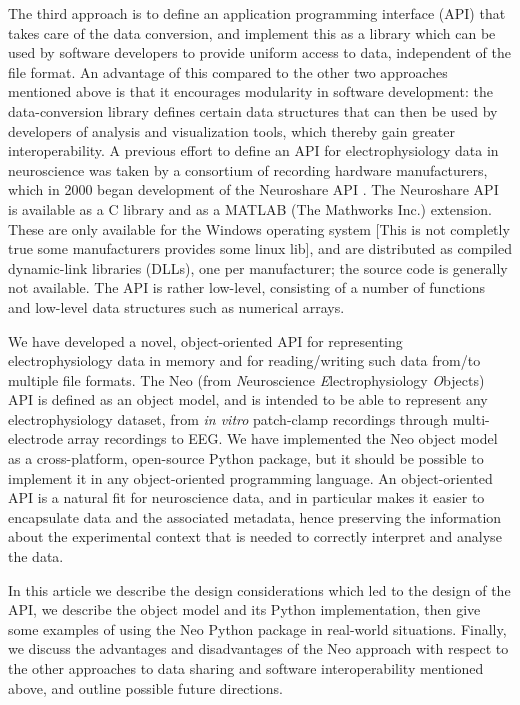 \documentclass{frontiers}
\newcommand{\latin}[1]{\textit{#1}}
\newcommand{\samuel}[1]{[\textcolor{RubineRed}{#1}]}
\begin{document}
The third approach is to define an application programming interface (API) that takes care of the data conversion, and implement this as a library which can be used by software developers to provide uniform access to data, independent of the file format.
An advantage of this compared to the other two approaches mentioned above is that it encourages modularity in software development: the data-conversion library defines certain data structures that can then be used by developers of analysis and visualization tools, which thereby gain greater interoperability.
A previous effort to define an API for electrophysiology data in neuroscience was taken by a consortium of recording hardware manufacturers, which in 2000 began development of the Neuroshare API \citep{neuroshare}.
The Neuroshare API is available as a C library and as a MATLAB (The Mathworks Inc.) extension.
These are only available for the Windows operating system \samuel{This is not completly true some manufacturers provides some linux lib}, and are distributed as compiled dynamic-link libraries (DLLs), one per manufacturer; the source code is generally not available.
The API is rather low-level, consisting of a number of functions and low-level data structures such as numerical arrays.

We have developed a novel, object-oriented API for representing electrophysiology data in memory and for reading/writing such data from/to multiple file formats.
The Neo (from \emph{N}euroscience \emph{E}lectrophysiology \emph{O}bjects) API is defined as an object model, and is intended to be able to represent any electrophysiology dataset, from \latin{in vitro} patch-clamp recordings through multi-electrode array recordings to EEG.
We have implemented the Neo object model as a cross-platform, open-source Python package, but it should be possible to implement it in any object-oriented programming language.
An object-oriented API is a natural fit for neuroscience data, and in particular makes it easier to encapsulate data and the associated metadata, hence preserving the information about the experimental context that is needed to correctly interpret and analyse the data.

In this article we describe the design considerations which led to the design of the API, we describe the object model and its Python implementation, then give some examples of using the Neo Python package in real-world situations. Finally, we discuss the advantages and disadvantages of the Neo approach with respect to the other approaches to data sharing and software interoperability mentioned above, and outline possible future directions.
\end{document}
